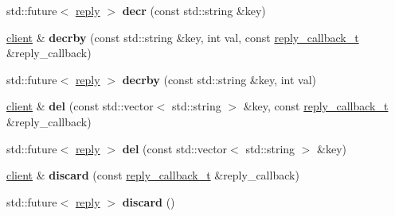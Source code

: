 \begin{DoxyCompactItemize}
\item 
\mbox{\label{classcpp__redis_1_1client_ac80abd9a238a7613294d4444bbc92907}} 
std\+::future$<$ \hyperlink{classcpp__redis_1_1reply}{reply} $>$ {\bfseries decr} (const std\+::string \&key)
\item 
\mbox{\label{classcpp__redis_1_1client_aaa45a662abeaa66f5a8c985cd27957c8}} 
\hyperlink{classcpp__redis_1_1client}{client} \& {\bfseries decrby} (const std\+::string \&key, int val, const \hyperlink{classcpp__redis_1_1client_a061a1140d36d2eaeda82b09a0bb3f9f2}{reply\+\_\+callback\+\_\+t} \&reply\+\_\+callback)
\item 
\mbox{\label{classcpp__redis_1_1client_ac4fe81368d7f9cc305811d8346e60881}} 
std\+::future$<$ \hyperlink{classcpp__redis_1_1reply}{reply} $>$ {\bfseries decrby} (const std\+::string \&key, int val)
\item 
\mbox{\label{classcpp__redis_1_1client_a29a5307b20d9ffe951e2ff302797a296}} 
\hyperlink{classcpp__redis_1_1client}{client} \& {\bfseries del} (const std\+::vector$<$ std\+::string $>$ \&key, const \hyperlink{classcpp__redis_1_1client_a061a1140d36d2eaeda82b09a0bb3f9f2}{reply\+\_\+callback\+\_\+t} \&reply\+\_\+callback)
\item 
\mbox{\label{classcpp__redis_1_1client_a99c090de7e23accfaf3b93f4b025d2e9}} 
std\+::future$<$ \hyperlink{classcpp__redis_1_1reply}{reply} $>$ {\bfseries del} (const std\+::vector$<$ std\+::string $>$ \&key)
\item 
\mbox{\label{classcpp__redis_1_1client_a0f5a07744750f87504f72dcf66144a24}} 
\hyperlink{classcpp__redis_1_1client}{client} \& {\bfseries discard} (const \hyperlink{classcpp__redis_1_1client_a061a1140d36d2eaeda82b09a0bb3f9f2}{reply\+\_\+callback\+\_\+t} \&reply\+\_\+callback)
\item 
\mbox{\label{classcpp__redis_1_1client_ab37e125f4f94bfa9455dc29f64698e47}} 
std\+::future$<$ \hyperlink{classcpp__redis_1_1reply}{reply} $>$ {\bfseries discard} ()
\item 
\mbox{\label{classcpp__redis_1_1client_aed6bb7657acdd4ea4dd0a4e7ec3eec20}} 

\end{DoxyCompactItemize}
